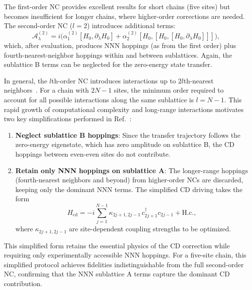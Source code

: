 \documentclass[
  reprint,
  amsmath,
  amssymb,
  aps,
  prb,
  longbibliography,
]{revtex4-2}
\begin{document}
The first-order NC provides excellent results for short chains (five sites)
but becomes insufficient for longer chains, where higher-order corrections
are needed. The second-order NC ($l = 2$) introduces additional terms:
\begin{equation}
  \mathcal{A}_\lambda^{(2)} = i\bigl(
  \alpha_1^{(2)} [H_0, \partial_\lambda H_0]
  + \alpha_2^{(2)} [H_0, [H_0, [H_0, \partial_\lambda H_0]]]
  \bigr),
  \label{eq:A2}
\end{equation}
which, after evaluation, produces NNN hoppings (as from the first order)
plus fourth-nearest-neighbor hoppings within and between sublattices. Again,
the sublattice B terms can be neglected for the zero-energy state transfer.

In general, the $l$th-order NC introduces interactions up to $2l$th-nearest
neighbors~\cite{Romero2024}. For a chain with $2N - 1$ sites, the minimum
order required to account for all possible interactions along the same
sublattice is $l = N - 1$. This rapid growth of computational complexity and
long-range interactions motivates two key simplifications performed
in Ref.~\cite{Romero2024}:

\begin{enumerate}
  \item \textbf{Neglect sublattice B hoppings}: Since the transfer trajectory
    follows the zero-energy eigenstate, which has zero amplitude on sublattice B,
    the CD hoppings between even-even sites do not contribute.
  \item \textbf{Retain only NNN hoppings on sublattice A}: The longer-range
    hoppings (fourth-nearest neighbors and beyond) from higher-order NCs are
    discarded, keeping only the dominant NNN terms. The simplified CD driving
    takes the form
    \begin{equation}
      H_{\mathrm{cd}} = -i \sum_{j=1}^{N-1}
      \kappa_{2j+1,2j-1}\, c_{2j+1}^\dagger c_{2j-1} + \text{H.c.},
      \label{eq:Hcd_simplified}
    \end{equation}
    where $\kappa_{2j+1,2j-1}$ are site-dependent coupling strengths to be
    optimized.
\end{enumerate}

This simplified form retains the essential physics of the CD correction while
requiring only experimentally accessible NNN hoppings. For a five-site chain,
this simplified protocol achieves fidelities indistinguishable from the full
second-order NC, confirming that the NNN sublattice A terms capture the
dominant CD contribution.
\end{document}
